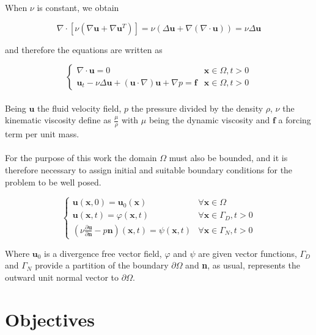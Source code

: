 \documentclass[12pt,letterpaper]{article}
\begin{document}
When $\nu$ is constant, we obtain

$$\nabla \cdot[\nu (\nabla \textbf{u} + \nabla \textbf{u}^T)] = \nu (\Delta \textbf{u} + \nabla(\nabla \cdot \textbf{u})) = \nu \Delta \textbf{u}$$

and therefore the equations are written as

\begin{equation}
  \begin{cases}
     \nabla \cdot \textbf{u} = 0 & \textbf{x} \in \Omega , t > 0\\
     
     \textbf{u}_t - \nu \Delta \textbf{u} + (\textbf{u}\cdot \nabla)
     \textbf{u}+ \nabla p = \textbf{f} & \textbf{x} \in \Omega , t > 0
  
  \end{cases}
  \label{2}
\end{equation}\\

Being $\textbf{u}$ the fluid velocity field, $p$ the pressure divided by the density $\rho$, $\nu$
the kinematic viscosity define as $\frac{\mu}{\rho}$ with $\mu$ being the dynamic viscosity and $\textbf{f}$ 
a forcing term per unit mass.\\~\\
For the purpose of this work the domain $\Omega$ must also be bounded, and it is therefore necessary 
to assign initial and suitable boundary conditions for the problem to be well posed.

$$\begin{cases}
  \textbf{u}(\textbf{x},0) = \textbf{u}_0(\textbf{x}) & \forall \textbf{x} \in \Omega \\
  \textbf{u}(\textbf{x},t) = \varphi(\textbf{x},t) & \forall \textbf{x}\in \varGamma_D, t>0 \\
  \left(\nu\frac{\partial \textbf{u}}{\partial \textbf{n}}-p\textbf{n}\right)(\textbf{x},t) = \psi(\textbf{x},t) & \forall \textbf{x}\in \varGamma_N, t>0

\end{cases}$$

Where $\textbf{u}_0$ is a divergence free vector field,  $\varphi$ and $\psi$ are given vector
functions, $\varGamma_D$ and $\varGamma_N$ provide a partition of the boundary $\partial \Omega$ and 
\textbf{n}, as usual, represents the outward unit normal vector to $\partial \Omega$.


\section{Objectives}
\end{document}
